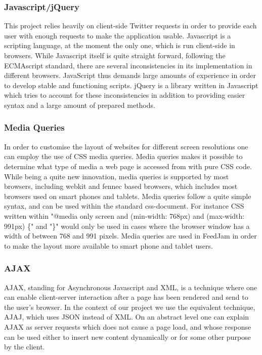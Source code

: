 \subsubsection{Javascript/jQuery} %
This project relies heavily on client-side Twitter requests in order to provide each user with enough requests to make the application usable. Javascript is a scripting language, at the moment the only one, which is run client-side in browsers. While Javascript itself is quite straight forward, following the ECMAscript standard, there are several inconsistencies in its implementation in different browsers. JavaScript thus demands large amounts of experience in order to develop stable and functioning scripts. jQuery is a library written in Javascript which tries to account for these inconsistencies in addition to providing easier syntax and a large amount of prepared methods.

\subsubsection{Media Queries} %
In order to customise the layout of websites for different screen resolutions one can employ the use of CSS media queries. Media queries makes it possible to determine what type of media a web page is accessed from with pure CSS code. While being a quite new innovation, media queries is supported by most browsers, including webkit and fennec based browsers, which includes most browsers used on smart phones and tablets. Media queries follow a quite simple syntax, and can be used within the standard css-document. For instance CSS written within "@media only screen and (min-width: 768px) and (max-width: 991px) \{" and "\}" would only be used in cases where the browser window has a width of between 768 and 991 pixels. Media queries are used in FeedJam in order to make the layout more available to smart phone and tablet users.

\subsubsection{AJAX}%
AJAX, standing for Asynchronous Javascript and XML, is a technique where one can enable client-server interaction after a page has been rendered and send to the user's browser. In the context of our project we use the equivalent technique, AJAJ, which uses JSON instead of XML. On an abstract level one can explain AJAX as server requests which does not cause a page load, and whose response can be used either to insert new content dynamically or for some other purpose by the client.


